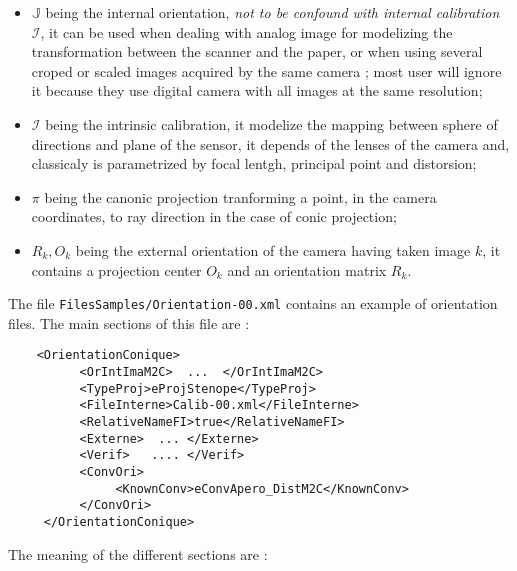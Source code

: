 \begin{itemize}
  \item  $\mathbb{J}$   being the internal orientation, \emph{not to be confound with internal calibration}
         $\mathcal{I}$, it can be used when dealing with analog image for modelizing the transformation
         between the scanner and the paper, or when using several croped or scaled images acquired by the same
         camera ; most user will ignore it because they use digital camera with all images at the same resolution;

  \item  $\mathcal{I}$ being the intrinsic  calibration,  it modelize the mapping between sphere of directions and
        plane of the sensor,  it depends of  the lenses of the camera and, classicaly is parametrized by 
         focal lentgh, principal point and distorsion;

  \item  $\pi$ being the canonic projection tranforming a point,  in the camera coordinates, to ray direction in the
         case of conic projection;

  \item  $R_k,O_k$ being the external orientation of the camera having taken image $k$, it contains a projection
         center $O_k$ and an orientation matrix $R_k$.
\end{itemize}

The file {\tt FilesSamples/Orientation-00.xml} contains an example of orientation
files. The main sections of this file are :

{\scriptsize
\begin{verbatim}
    <OrientationConique>
          <OrIntImaM2C>  ...  </OrIntImaM2C>
          <TypeProj>eProjStenope</TypeProj>
          <FileInterne>Calib-00.xml</FileInterne>
          <RelativeNameFI>true</RelativeNameFI>
          <Externe>  ... </Externe>
          <Verif>   .... </Verif>
          <ConvOri>
               <KnownConv>eConvApero_DistM2C</KnownConv>
          </ConvOri>
     </OrientationConique>
\end{verbatim}
}

The meaning  of the different sections are :

